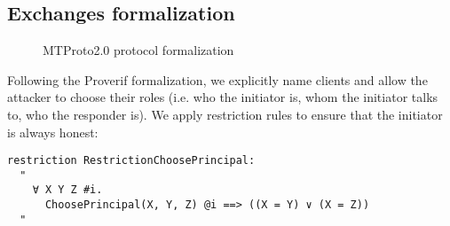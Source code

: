 \subsection{Exchanges formalization}
\begin{figure}[!t]
  \setlength{\instdist}{3cm}
  \setmscoptions
  \begin{msc}{}



    \nextlevel[7]
    \nextlevel


    \nextlevel[6]
    \nextlevel


    \nextlevel[3]
    \nextlevel[4]

  \end{msc}

  \centering
  \caption{MTProto2.0 \Schat{} protocol formalization}
  \label{fig:secret-chat-protocol-formalization}
\end{figure}

Following the Proverif formalization, we explicitly name clients and allow the attacker to choose their roles (i.e. who the initiator is, whom the initiator talks to, who the responder is). We apply restriction rules to ensure that the initiator is always honest:

\newpage

\begin{lstlisting}
restriction RestrictionChoosePrincipal:
  "
    ∀ X Y Z #i.
      ChoosePrincipal(X, Y, Z) @i ==> ((X = Y) ∨ (X = Z))
  "
\end{lstlisting}

